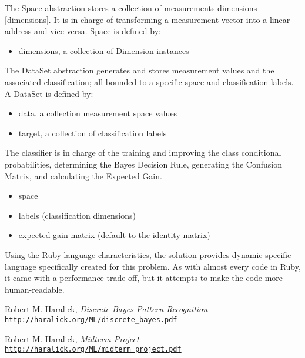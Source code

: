 \documentclass[letterpaper, conference]{IEEEtran}
\begin{document}
The Space abstraction stores a collection of measurements dimensions \ref{dimensions}. It is in charge of transforming a measurement vector into a linear address and vice-versa. Space is defined by:

\begin{itemize}
  \item dimensions, a collection of Dimension instances
\end{itemize}

The DataSet abstraction generates and stores measurement values and the associated classification; all bounded to a specific space and classification labels. A DataSet is defined by: 

\begin{itemize}
  \item data, a collection measurement space values
  \item target, a collection of classification labels
\end{itemize}

The classifier is in charge of the training and improving the class conditional probabilities, determining the Bayes Decision Rule, generating the Confusion Matrix, and calculating the Expected Gain.

\begin{itemize}
  \item space
  \item labels (classification dimensions)
  \item expected gain matrix (default to the identity matrix)
\end{itemize}

Using the Ruby language characteristics, the solution provides dynamic specific language specifically created for this problem. As with almost every code in Ruby, it came with a performance trade-off, but it attempts to make the code more human-readable.

\begin{thebibliography}{2}

Robert M. Haralick,
\textit{Discrete Bayes Pattern Recognition}
\\\texttt{\url{http://haralick.org/ML/discrete_bayes.pdf}}

Robert M. Haralick,
\textit{Midterm Project}
\\\texttt{\url{http://haralick.org/ML/midterm_project.pdf}}

\end{thebibliography}
\end{document}
